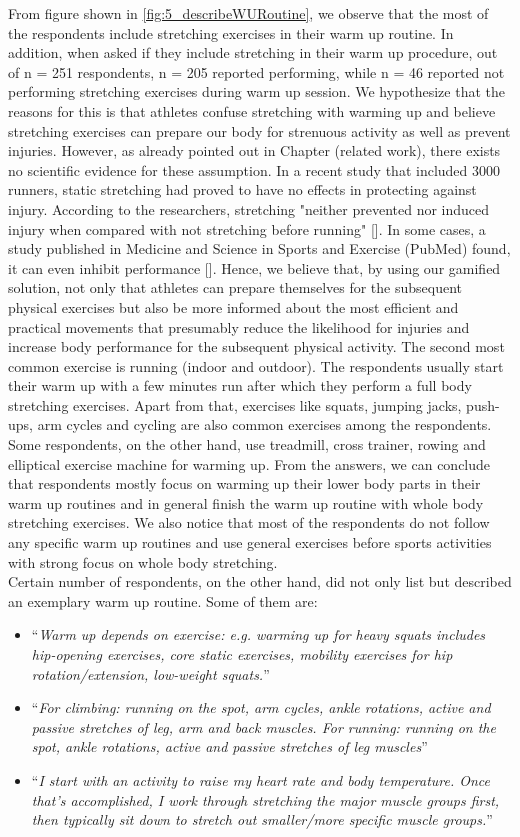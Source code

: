 From figure shown in \ref{fig:5_describeWURoutine}, we observe that the most of the respondents include stretching exercises in their warm up routine. In addition, when asked if they include stretching in their warm up procedure, out of n = 251 respondents, n = 205 reported performing, while n = 46 reported not performing stretching exercises during warm up session. We hypothesize that the reasons for this is that athletes confuse stretching with warming up and believe stretching exercises can prepare our body for strenuous activity as well as prevent injuries. However, as already pointed out in Chapter (related work), there exists no scientific evidence for these assumption. In a recent study that included 3000 runners, static stretching had proved to have no effects in protecting against injury. According to the researchers, stretching "neither prevented nor induced injury when compared with not stretching before running" []. In some cases, a study published in Medicine and Science in Sports and Exercise (PubMed) found, it can even inhibit performance []. Hence, we believe that, by using our gamified solution, not only that athletes can prepare themselves for the subsequent physical exercises but also be more informed about the most efficient and practical movements that presumably reduce the likelihood for injuries and increase body performance for the subsequent physical activity. The second most common exercise is running (indoor and outdoor). The respondents usually start their warm up with a few minutes run after which they perform a full body stretching exercises. Apart from that, exercises like squats, jumping jacks, push-ups, arm cycles and cycling are also common exercises among the respondents. Some respondents, on the other hand, use treadmill, cross trainer, rowing and elliptical exercise machine for warming up. From the answers, we can conclude that respondents mostly focus on warming up their lower body parts in their warm up routines and in general finish the warm up routine with whole body stretching exercises. We also notice that most of the respondents do not follow any specific warm up routines and use general exercises before sports activities with strong focus on whole body stretching.\\Certain number of respondents, on the other hand, did not only list but described an exemplary warm up routine. Some of them are: 
\begin{itemize}
\item ``\textit{Warm up depends on exercise: e.g. warming up for heavy squats includes hip-opening exercises, core static exercises, mobility exercises for hip rotation/extension, low-weight squats.}''
\item ``\textit{For climbing: running on the spot, arm cycles, ankle rotations, active and passive stretches of leg, arm and back muscles.  For running: running on the spot, ankle rotations, active and passive stretches of leg muscles}''
\item ``\textit{I start with an activity to raise my heart rate and body temperature. Once that's accomplished, I work through stretching the major muscle groups first, then typically sit down to stretch out smaller/more specific muscle groups.}''
\end{itemize}
